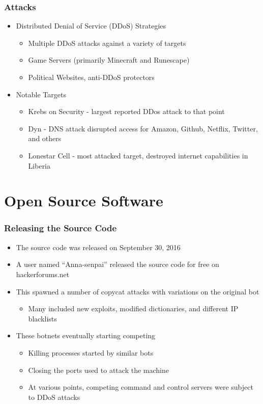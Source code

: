 \documentclass{beamer}
\begin{document}
\begin{frame}
    \frametitle{Attacks}
	\begin{itemize}
		\item<+->Distributed Denial of Service (DDoS) Strategies
			\begin{itemize}
				\item<+->Multiple DDoS attacks against a variety of targets
				\item<+->Game Servers (primarily Minecraft and Runescape)
				\item<+->Political Websites, anti-DDoS protectors
			\end{itemize}
		\item<+->Notable Targets
			\begin{itemize}
				\item<+->Krebs on Security - largest reported DDos attack to that point
				\item<+->Dyn - DNS attack disrupted access for Amazon, Github, Netflix, Twitter, and others
				\item<+->Lonestar Cell - most attacked target, destroyed internet capabilities in Liberia
			\end{itemize}
	\end{itemize}
\end{frame}

\section{Open Source Software}

\begin{frame}
	\frametitle{Releasing the Source Code}
	\begin{itemize}
		\item<+-> The source code was released on September 30, 2016
		\item<+-> A user named ``Anna-senpai'' released the source code for free on hackerforums.net
		\item<+-> This spawned a number of copycat attacks with variations on the original bot
		\begin{itemize}
			\item<+-> Many included new exploits, modified dictionaries, and different IP blacklists
		\end{itemize}
		\item<+-> These botnets eventually starting competing
		\begin{itemize}
			\item<+-> Killing processes started by similar bots
			\item<+-> Closing the ports used to attack the machine
			\item<+-> At various points, competing command and control servers were subject to DDoS attacks
		\end{itemize}
	\end{itemize}
\end{frame}
\end{document}
